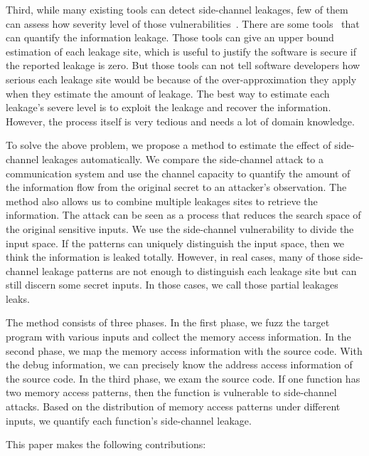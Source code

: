 Third, while many existing tools can detect side-channel leakages, few of them can assess how severity level of those vulnerabilities~\cite{203878,182946,Brotzman19Casym,236338,217537,Wichelmann:2018:MFF:3274694.3274741}. There are some tools~\cite{182946,Chattopadhyay:2017:QIL:3127041.3127044} that can quantify the information leakage. Those tools can give an upper bound estimation of each leakage site, which is useful to justify the software is secure if the reported leakage is zero. But those tools can not tell software developers how serious each leakage site would be because of the over-approximation they apply when they estimate the amount of leakage. The best way to estimate each leakage's severe level is to exploit the leakage and recover the information. However, the process itself is very tedious and needs a lot of domain knowledge.

To solve the above problem, we propose a method to estimate the effect of side-channel leakages automatically. We compare the side-channel attack to a communication system and use the channel capacity to quantify the amount of the information flow from the original secret to an attacker's observation. The method also allows us to combine multiple leakages sites to retrieve the information. The attack can be seen as a process that reduces the search space of the original sensitive inputs. We use the side-channel vulnerability to divide the input space. If the patterns can uniquely distinguish the input space, then we think the information is leaked totally. However, in real cases, many of those side-channel leakage patterns are not enough to distinguish each leakage site but can still discern some secret inputs. In those cases, we call those partial leakages leaks.

The method consists of three phases. In the first phase, we fuzz the target program with various inputs and collect the memory access information. In the second phase, we map the memory access information with the source code. With the debug information, we can precisely know the address access information of the source code. In the third phase, we exam the source code. If one function has two memory access patterns, then the function is vulnerable to side-channel attacks. Based on the distribution of memory access patterns under different inputs, we quantify each function's side-channel leakage.

This paper makes the following contributions:

